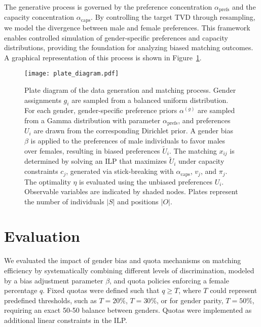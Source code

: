 \documentclass[letterpaper]{article}
\begin{document}
The generative process is governed by the preference concentration \( \alpha_\mathrm{prefs} \) and the capacity concentration \( \alpha_\mathrm{caps} \). By controlling the target TVD through resampling, we model the divergence between male and female preferences. This framework enables controlled simulation of gender-specific preferences and capacity distributions, providing the foundation for analyzing biased matching outcomes. A graphical representation of this process is shown in Figure~\ref{fig:plate_diagram}.



\begin{figure}[ht]
  \centering
  \texttt{[image: plate\_diagram.pdf]}
\caption{Plate diagram of the data generation and matching process. Gender assignments \( g_i \) are sampled from a balanced uniform distribution. For each gender, gender-specific preference priors \( \alpha^{(g)} \) are sampled from a Gamma distribution with parameter \( \alpha_\mathrm{prefs} \), and preferences \( U_i \) are drawn from the corresponding Dirichlet prior. A gender bias \( \beta \) is applied to the preferences of male individuals to favor males over females, resulting in biased preferences \( \tilde{U}_i \). The matching \( x_{ij} \) is determined by solving an ILP that maximizes \( \tilde{U}_i \) under capacity constraints \( c_j \), generated via stick-breaking with \( \alpha_\mathrm{caps} \), \( v_j \), and \( \pi_j \). The optimality \( \eta \) is evaluated using the unbiased preferences \( U_i \). Observable variables are indicated by shaded nodes. Plates represent the number of individuals \( |S| \) and positions \( |O| \).}
\label{fig:plate_diagram}
\end{figure}

\section{Evaluation}

We evaluated the impact of gender bias and quota mechanisms on matching efficiency by systematically combining different levels of discrimination, modeled by a bias adjustment parameter \( \beta \), and quota policies enforcing a female percentage \(q\). Fixed quotas were defined such that \( q \geq T \), where \( T \) could represent predefined thresholds, such as \( T = 20\%\), \( T = 30\%\), or for gender parity, \( T = 50\%\), requiring an exact 50-50 balance between genders. Quotas were implemented as additional linear constraints in the ILP. 
\end{document}
